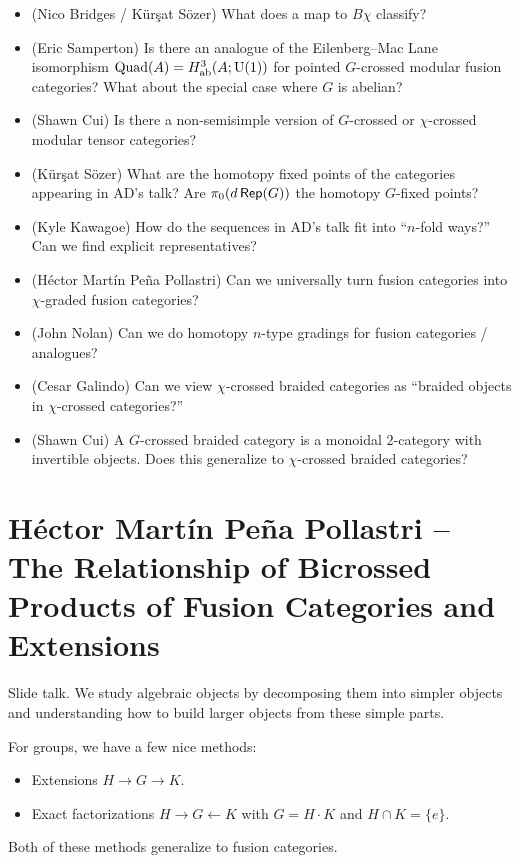 \documentclass{amsart}
\begin{document}
\begin{itemize}
  \item (Nico Bridges / K\"ur\c{s}at S\"ozer) What does a map to $B\chi$ classify?
  \item (Eric Samperton) Is there an analogue of the Eilenberg--Mac Lane isomorphism $\operatorname{Quad}(A) = H^3_{\mathrm{ab}}(A; \mathrm{U}(1))$ for pointed $G$-crossed modular fusion categories?
    What about the special case where $G$ is abelian?
  \item (Shawn Cui) Is there a non-semisimple version of $G$-crossed or $\chi$-crossed modular tensor categories?
  \item (K\"ur\c{s}at S\"ozer) What are the homotopy fixed points of the categories appearing in AD's talk?
    Are $\pi_0(d\operatorname{\mathsf{Rep}}(G))$ the homotopy $G$-fixed points?
  \item (Kyle Kawagoe) How do the sequences in AD's talk fit into ``$n$-fold ways?''
    Can we find explicit representatives?
  \item (H\'ector Mart\'in Pe\~na Pollastri) Can we universally turn fusion categories into $\chi$-graded fusion categories?
  \item (John Nolan) Can we do homotopy $n$-type gradings for fusion categories / analogues?
  \item (Cesar Galindo) Can we view $\chi$-crossed braided categories as ``braided objects in $\chi$-crossed categories?''
  \item (Shawn Cui) A $G$-crossed braided category is a monoidal $2$-category with invertible objects.
    Does this generalize to $\chi$-crossed braided categories?
\end{itemize}

\section{H\'ector Mart\'in Pe\~na Pollastri -- The Relationship of Bicrossed Products of Fusion Categories and Extensions}

Slide talk.
We study algebraic objects by decomposing them into simpler objects and understanding how to build larger objects from these simple parts.

For groups, we have a few nice methods:
\begin{itemize}
  \item Extensions $H \to G \to K$.
  \item Exact factorizations $H \to G \leftarrow K$ with $G = H \cdot K$ and $H \cap K = \{ e \}$.
\end{itemize}
Both of these methods generalize to fusion categories.
\end{document}
